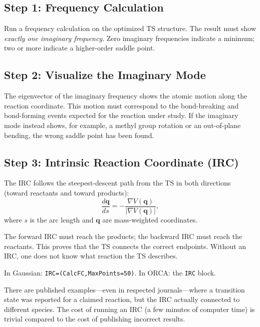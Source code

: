 \documentclass[11pt]{article}
\numberwithin{equation}{section}
\begin{document}
\subsection{Step 1: Frequency Calculation}

Run a frequency calculation on the optimized TS structure. The result must show \emph{exactly one imaginary frequency}. Zero imaginary frequencies indicate a minimum; two or more indicate a higher-order saddle point.

\subsection{Step 2: Visualize the Imaginary Mode}

The eigenvector of the imaginary frequency shows the atomic motion along the reaction coordinate. This motion must correspond to the bond-breaking and bond-forming events expected for the reaction under study. If the imaginary mode instead shows, for example, a methyl group rotation or an out-of-plane bending, the wrong saddle point has been found.

\subsection{Step 3: Intrinsic Reaction Coordinate (IRC)}

The IRC follows the steepest-descent path from the TS in both directions (toward reactants and toward products):
\begin{equation}
\frac{d\mathbf{q}}{ds} = -\frac{\nabla V(\mathbf{q})}{|\nabla V(\mathbf{q})|},
\label{eq:IRC}
\end{equation}
where $s$ is the arc length and $\mathbf{q}$ are mass-weighted coordinates.

The forward IRC must reach the products; the backward IRC must reach the reactants. This proves that the TS connects the correct endpoints. Without an IRC, one does not know what reaction the TS describes.

In Gaussian: \texttt{IRC=(CalcFC,MaxPoints=50)}. In ORCA: the \texttt{IRC} block.

There are published examples---even in respected journals---where a transition state was reported for a claimed reaction, but the IRC actually connected to different species. The cost of running an IRC (a few minutes of computer time) is trivial compared to the cost of publishing incorrect results.


\end{document}
